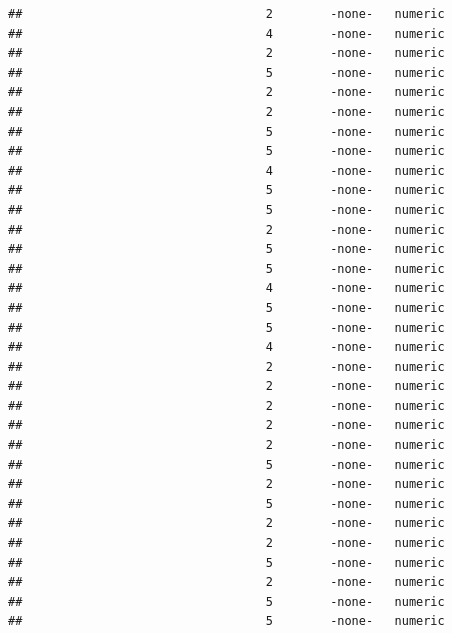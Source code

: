 \documentclass[
  12pt,
]{article}
\begin{document}
\begin{verbatim}
##                                  2        -none-   numeric                    
##                                  4        -none-   numeric                    
##                                  2        -none-   numeric                    
##                                  5        -none-   numeric                    
##                                  2        -none-   numeric                    
##                                  2        -none-   numeric                    
##                                  5        -none-   numeric                    
##                                  5        -none-   numeric                    
##                                  4        -none-   numeric                    
##                                  5        -none-   numeric                    
##                                  5        -none-   numeric                    
##                                  2        -none-   numeric                    
##                                  5        -none-   numeric                    
##                                  5        -none-   numeric                    
##                                  4        -none-   numeric                    
##                                  5        -none-   numeric                    
##                                  5        -none-   numeric                    
##                                  4        -none-   numeric                    
##                                  2        -none-   numeric                    
##                                  2        -none-   numeric                    
##                                  2        -none-   numeric                    
##                                  2        -none-   numeric                    
##                                  2        -none-   numeric                    
##                                  5        -none-   numeric                    
##                                  2        -none-   numeric                    
##                                  5        -none-   numeric                    
##                                  2        -none-   numeric                    
##                                  2        -none-   numeric                    
##                                  5        -none-   numeric                    
##                                  2        -none-   numeric                    
##                                  5        -none-   numeric                    
##                                  5        -none-   numeric                    

\end{verbatim}
\end{document}
